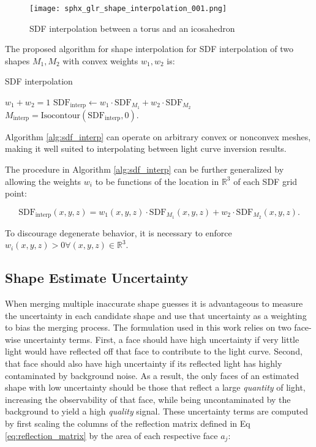 \begin{figure}[!htb]
  \centering
  \texttt{[image: sphx\_glr\_shape\_interpolation\_001.png]}
  \caption{SDF interpolation between a torus and an icosahedron}
  \label{fig:interpolating_torus_ico}
\end{figure}

The proposed algorithm for shape interpolation for SDF interpolation of two shapes $M_1, M_2$ with convex weights $w_1, w_2$ is:

\begin{algorithm}
  \caption{SDF interpolation}\label{alg:sdf_interp}
  \begin{algorithmic}
  \Require $w_1 + w_2 = 1$
  \State $\mathrm{SDF}_{\textrm{interp}} \gets w_1 \cdot \mathrm{SDF}_{M_1} + w_2 \cdot \mathrm{SDF}_{M_2}$
  \State $M_{\textrm{interp}} = \mathrm{Isocontour}(\mathrm{SDF}_{\textrm{interp}}, 0)$.
  \end{algorithmic}
\end{algorithm}

Algorithm \ref{alg:sdf_interp} can operate on arbitrary convex or nonconvex meshes, making it well suited to interpolating between light curve inversion results.

The procedure in Algorithm \ref{alg:sdf_interp} can be further generalized by allowing the weights $w_i$ to be functions of the location in $\mathbb{R}^3$ of each SDF grid point:

\begin{equation}
  \mathrm{SDF}_{\mathrm{interp}}(x, y, z) = w_1(x, y, z) \cdot \mathrm{SDF}_{M_1}(x, y, z) + w_2 \cdot \mathrm{SDF}_{M_2}(x, y, z).
\end{equation}

To discourage degenerate behavior, it is necessary to enforce $w_i(x,y,z) > 0 \forall (x,y,z) \in \mathbb{R}^3$.

\subsection{Shape Estimate Uncertainty}

When merging multiple inaccurate shape guesses it is advantageous to measure the uncertainty in each candidate shape and use that uncertainty as a weighting to bias the merging process. The formulation used in this work relies on two face-wise uncertainty terms. First, a face should have high uncertainty if very little light would have reflected off that face to contribute to the light curve. Second, that face should also have high uncertainty if its reflected light has highly contaminated by background noise. As a result, the only faces of an estimated shape with low uncertainty should be those that reflect a large \textit{quantity} of light, increasing the observability of that face, while being uncontaminated by the background to yield a high \textit{quality} signal. These uncertainty terms are computed by first scaling the columns of the reflection matrix defined in Eq \ref{eq:reflection_matrix} by the area of each respective face $a_j$:


